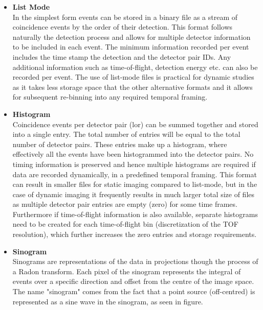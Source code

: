 \begin{itemize}

\item\textbf{List Mode}\\
In the simplest form events can be stored in a binary file as a stream of coincidence events by the order of their detection. This format follows naturally the detection process and allows for multiple detector information to be included in each event. The minimum information recorded per event includes the time stamp the detection and the detector pair IDs. Any additional information such as time-of-flight, detection energy etc. can also be recorded per event.
The use of list-mode files is practical for dynamic studies as it takes less storage space that the other alternative formats and it allows for subsequent re-binning into any required temporal framing.

\item\textbf{Histogram}\\
Coincidence events per detector pair (\gls{lor}) can be summed together and stored into a single entry. The total number of entries will be equal to the total number of detector pairs. These entries make up a histogram, where effectively all the events have been histogrammed into the detector pairs. No timing information is preserved and hence multiple histograms are required if data are recorded dynamically, in a predefined temporal framing. 
This format can result in smaller files for static imaging compared to list-mode, but in the case of dynamic imaging it frequently results in much larger total size of files as multiple detector pair entries are empty (zero) for some time frames. Furthermore if time-of-flight information is also available, separate histograms need to be created for each time-of-flight bin (discretization of the TOF resolution), which further increases the zero entries and storage requirements. 

\item\textbf{Sinogram}\\
Sinograms are representations of the data in projections though the process of a Radon transform. Each pixel of the sinogram represents the integral of events over a specific direction and offset from the centre of the image space. The name "sinogram" comes from the fact that a point source (off-centred) is represented as a sine wave in the sinogram, as seen in figure.


\end{itemize}
